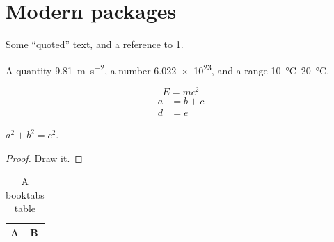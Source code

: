 \section{Modern packages}
\label{sec:packages}

Some \enquote{quoted} text, and a reference to \cref{sec:packages}.

A quantity \qty{9.81}{\metre\per\second\squared}, a number \num{6.022e23}, and a range \qtyrange{10}{20}{\celsius}.

\begin{equation}
  E = mc^2 \label{eq:energy}
\end{equation}
\begin{align}
  a &= b + c \\
  d &= e
\end{align}

\begin{theorem}[Pythagoras]
  $a^2 + b^2 = c^2$.
\end{theorem}
\begin{proof}
  Draw it.
\end{proof}

\begin{table}[htbp]
  \centering
  \caption{A booktabs table}
  \begin{tabular}{ll}
    \toprule
    A & B \\
    \bottomrule
  \end{tabular}
\end{table}
